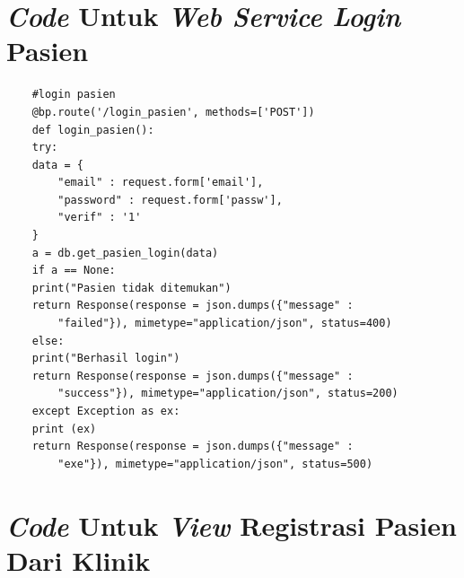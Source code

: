 \chapter{\emph{Code} Untuk \emph{Web Service Login} Pasien}

\begin{lstlisting}
	#login pasien
	@bp.route('/login_pasien', methods=['POST'])
	def login_pasien():
	try:
	data = { 
		"email" : request.form['email'], 
		"password" : request.form['passw'],
		"verif" : '1'
	}
	a = db.get_pasien_login(data)
	if a == None:
	print("Pasien tidak ditemukan")
	return Response(response = json.dumps({"message" :
		"failed"}), mimetype="application/json", status=400)
	else:
	print("Berhasil login")
	return Response(response = json.dumps({"message" :
		"success"}), mimetype="application/json", status=200)
	except Exception as ex:
	print (ex)
	return Response(response = json.dumps({"message" :
		"exe"}), mimetype="application/json", status=500)
\end{lstlisting}

\chapter{\emph{Code} Untuk \emph{View} Registrasi Pasien Dari Klinik}

